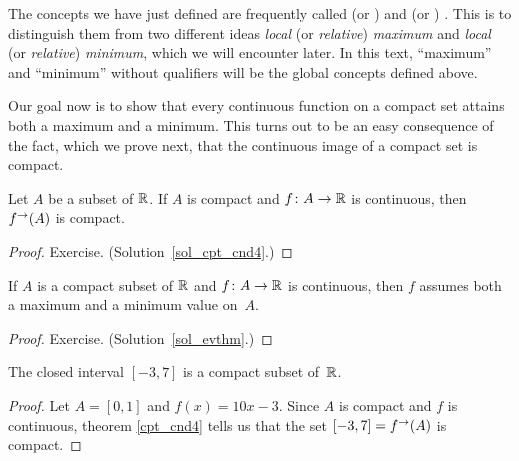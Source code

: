 The concepts we have just defined are frequently called
 (or )  and
 (or ) .  This is to
distinguish them from two different ideas
\emph{local} (or \emph{relative}) \emph{maximum} and
\emph{local} (or \emph{relative}) \emph{minimum}, which we will encounter later.   In this
text, ``maximum'' and ``minimum'' without qualifiers will be the global concepts defined
above.

Our goal now is to show that every continuous function on a compact set attains both a maximum
and a minimum.  This turns out to be an easy consequence of the fact, which we prove next,
that the continuous image of a compact set is compact.

\begin{thm}\label{cpt_cnd4} Let $A$ be a subset of $\mathbb{R}$.  If $A$ is compact and $f\colon A \rightarrow \mathbb{R}$
is continuous, then $f^{\rightarrow}(A)$ is compact.
\end{thm}

\begin{proof} Exercise. (Solution~\ref{sol_cpt_cnd4}.)
   \ns \end{proof}

\begin{thm}\label{evthm} If $A$ is a compact subset of $\mathbb{R}$ and
$f \colon A \rightarrow \mathbb{R}$ is continuous, then $f$ assumes both a maximum and a minimum value
on~$A$.
\end{thm}

\begin{proof} Exercise.  (Solution~\ref{sol_evthm}.)
  \ns \end{proof}

\begin{exam}  The closed interval $[-3,7]$ is a compact subset of~$\mathbb{R}$.
\end{exam}

\begin{proof} Let $A = [0,1]$ and $f(x) = 10x-3$.  Since $A$ is compact and $f$ is continuous,
theorem \ref{cpt_cnd4} tells us that the set $[-3,7] = f^\rightarrow(A)$ is compact.
\end{proof}

